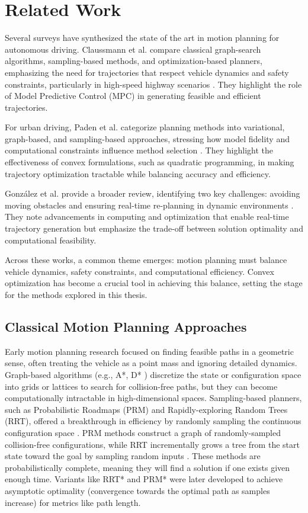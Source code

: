 \section{Related Work} \label{sec:related_work}

Several surveys have synthesized the state of the art in motion planning for autonomous driving.
Claussmann et al.
compare classical graph-search algorithms, sampling-based methods, and optimization-based planners,
emphasizing the need for trajectories that respect vehicle dynamics and safety constraints, particularly in high-speed highway scenarios \cite{claussmann_review_2020}.
They highlight the role of Model Predictive Control (MPC) in generating feasible and efficient trajectories.

For urban driving, Paden et al.
categorize planning methods into variational, graph-based, and sampling-based approaches, stressing how model fidelity and computational constraints
influence method selection \cite{paden_survey_2016}.
They highlight the effectiveness of convex formulations, such as quadratic programming, in making trajectory optimization tractable while balancing
accuracy and efficiency.

González et al.
provide a broader review, identifying two key challenges: avoiding moving obstacles and ensuring real-time re-planning in dynamic environments \cite{gonzalez_bautista_review_2015}.
They note advancements in computing and optimization that enable real-time trajectory generation but emphasize the trade-off between solution
optimality and computational feasibility.

Across these works, a common theme emerges: motion planning must balance vehicle dynamics, safety constraints, and computational efficiency.
Convex optimization has become a crucial tool in achieving this balance, setting the stage for the methods explored in this thesis.
\subsection{Classical Motion Planning Approaches}

Early motion planning research focused on finding feasible paths in a geometric sense, often treating the vehicle as a point mass and ignoring
detailed dynamics.
Graph-based algorithms (e.g., A*, D* \cite{dolgov_path_2010}) discretize the state or configuration space into grids or lattices to search for
collision-free paths, but they can become computationally intractable in high-dimensional spaces.
Sampling-based planners, such as Probabilistic Roadmaps (PRM) and Rapidly-exploring Random Trees (RRT), offered a breakthrough in efficiency by
randomly sampling the continuous configuration space \cite{orthey_sampling-based_2024}.
PRM methods construct a graph of randomly-sampled collision-free configurations, while RRT incrementally grows a tree from the start state toward the
goal by sampling random inputs \cite{orthey_sampling-based_2024}.
These methods are probabilistically complete, meaning they will find a solution if one exists given enough time.
Variants like RRT* and PRM* were later developed to achieve asymptotic optimality (convergence towards the optimal path as samples increase) for
metrics like path length.

